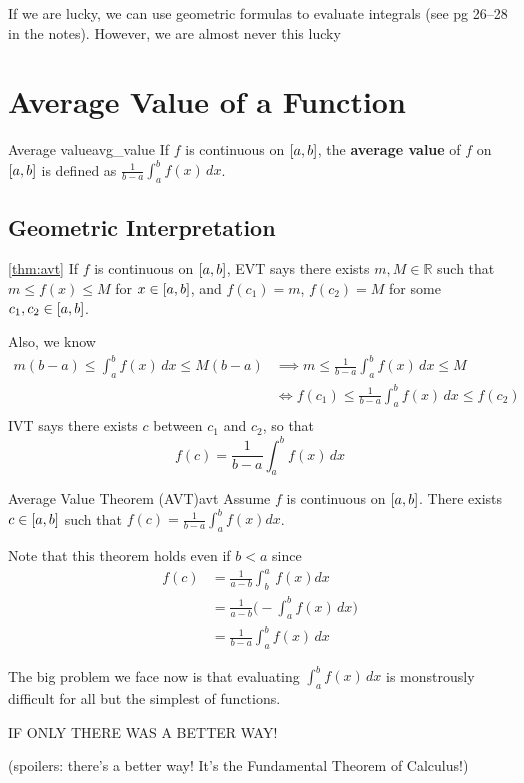 \begin{Remark}{}{}
    If we are lucky, we can use geometric formulas to evaluate integrals
    (see pg 26--28 in the notes). However, we are almost never this lucky\textellipsis{}
\end{Remark}

\section{Average Value of a Function}

\begin{Definition}{Average value}{avg_value}
    If $ f $ is continuous on $ \interval{a}{b} $, the \textbf{average value} of $ f $
    on $ \interval{a}{b} $ is defined as
    $ \displaystyle \frac{1}{b-a} \int_{a}^{b} f(x)\,dx $.
\end{Definition}

\subsection*{Geometric Interpretation}
\begin{Proof}{\ref{thm:avt}}{}
    If $ f $ is continuous on $ \interval{a}{b} $, EVT says there exists $ m,M\in\mathbb{R} $ such that
    $ \displaystyle m\le f(x) \le M $
    for $ x\in\interval{a}{b} $, and $ f(c_1)=m $, $ f(c_2)=M $ for some $ c_1,c_2\in\interval{a}{b} $.

    Also, we know
    \begin{align*}
        m(b-a)\le \int_{a}^{b} f(x)\, d{x} \le M(b-a)
         & \implies m\le \frac{1}{b-a} \int_{a}^{b} f(x)\, d{x} \le M       \\
         & \iff f(c_1)\le \frac{1}{b-a} \int_{a}^{b} f(x)\, d{x} \le f(c_2) \\
    \end{align*}
    IVT says there exists $ c $ between $ c_1 $ and $ c_2 $, so that
    \[ f(c)=\frac{1}{b-a} \int_{a}^{b} f(x)\, d{x} \]
\end{Proof}

\begin{Theorem}{Average Value Theorem (AVT)}{avt}
    Assume $ f $ is continuous on $ \interval{a}{b} $.
    There exists $ c\in\interval{a}{b} $ such that
    $ \displaystyle f(c)=\frac{1}{b-a} \int_{a}^{b} f(x) d{x} $.
\end{Theorem}

\begin{Remark}{}{}
    Note that this theorem holds even if $ b<a $ since
    \begin{align*}
        f(c) & =\frac{1}{a-b} \int_{b}^{a}\, f(x)dx                  \\
             & =\frac{1}{a-b}\biggl(-\int_{a}^{b} f(x)\, d{x}\biggr) \\
             & =\frac{1}{b-a} \int_{a}^{b} f(x)\, d{x}
    \end{align*}
\end{Remark}

The big problem we face now is that evaluating $ \int_{a}^{b} f(x)\, d{x} $ is
monstrously difficult for all but the simplest of functions.

IF ONLY THERE WAS A BETTER WAY\@!

(spoilers: there's a better way! It's the Fundamental Theorem of Calculus!)

